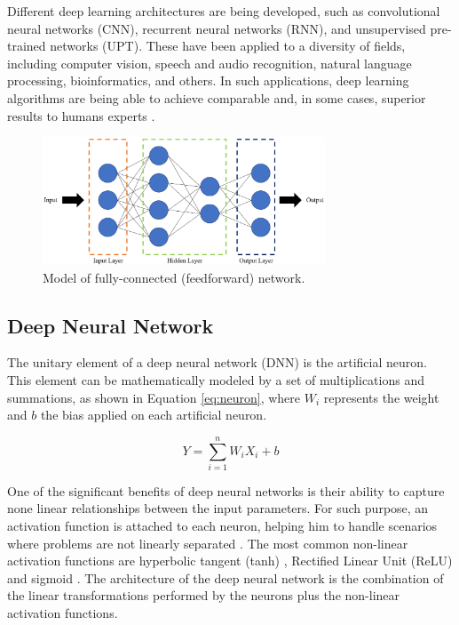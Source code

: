 Different deep learning architectures are being developed, such as convolutional neural networks (CNN), recurrent neural networks (RNN), and unsupervised pre-trained networks (UPT). These have been applied to a diversity of fields, including computer vision, speech and audio recognition, natural language processing, bioinformatics, and others. In such applications, deep learning algorithms are being able to achieve comparable and, in some cases, superior results to humans experts \cite{noauthor_googles_nodate}.

\begin{figure}[!htb]
  \centering
  \includegraphics[width=0.75\textwidth]{Figures/DL/DNNarch.png}
  \caption[]{Model of fully-connected (feedforward) network.}
  \label{fig:DNNarch}
\end{figure}


\subsection{Deep Neural Network}
The unitary element of a deep neural network (DNN) is the artificial neuron. This element can be mathematically modeled by a set of multiplications and summations, as shown in Equation \ref{eq:neuron}, where $W_i$ represents the weight and $b$ the bias applied on each artificial neuron.

\begin{equation}
\label{eq:neuron}
    Y = \sum_{i=1}^{n} W_iX_i+b
\end{equation}

One of the significant benefits of deep neural networks is their ability to capture none linear relationships between the input parameters. For such purpose, an activation function is attached to each neuron, helping him to handle scenarios where problems are not linearly separated \cite{dong_dnnmark:_2017}. The most common non-linear activation functions are  hyperbolic tangent (tanh) \cite{orr_neural_1998}, Rectified Linear Unit (ReLU) \cite{orr_neural_1998} and sigmoid \cite{orr_neural_1998}. The architecture of the deep neural network is the combination of the linear transformations performed by the neurons plus the non-linear activation functions.

